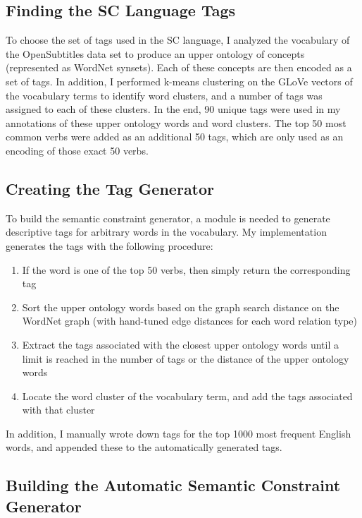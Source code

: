 \documentclass{article}
\numberwithin{equation}{section}
\begin{document}
\subsection{Finding the SC Language Tags}

To choose the set of tags used in the SC language, I analyzed the vocabulary of the OpenSubtitles data set to produce an upper ontology of concepts (represented as WordNet \cite{wordnet} synsets). Each of these concepts are then encoded as a set of tags. In addition, I performed k-means clustering on the GLoVe vectors \cite{glove} of the vocabulary terms to identify word clusters, and a number of tags was assigned to each of these clusters. In the end, 90 unique tags were used in my annotations of these upper ontology words and word clusters. The top 50 most common verbs were added as an additional 50 tags, which are only used as an encoding of those exact 50 verbs.

\subsection{Creating the Tag Generator}

To build the semantic constraint generator, a module is needed to generate descriptive tags for arbitrary words in the vocabulary. My implementation generates the tags with the following procedure:
\begin{enumerate}[topsep=0pt, partopsep=0pt, itemsep=2pt, parsep=0pt]
\item If the word is one of the top 50 verbs, then simply return the corresponding tag
\item Sort the upper ontology words based on the graph search distance on the WordNet graph (with hand-tuned edge distances for each word relation type)
\item Extract the tags associated with the closest upper ontology words until a limit is reached in the number of tags or the distance of the upper ontology words
\item Locate the word cluster of the vocabulary term, and add the tags associated with that cluster
\end{enumerate}

In addition, I manually wrote down tags for the top 1000 most frequent English words, and appended these to the automatically generated tags.

\subsection{Building the Automatic Semantic Constraint Generator}
\end{document}
